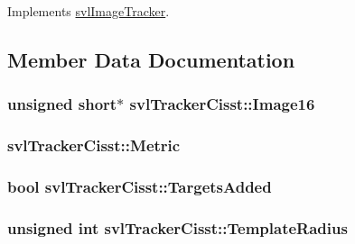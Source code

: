 Implements \hyperlink{classsvl_image_tracker_aa806fe1fe56828124a85cb81e0d7bd7f}{svl\-Image\-Tracker}.



\subsection{Member Data Documentation}
\hypertarget{classsvl_tracker_cisst_a3ad9f3f0177e9f8561d4d625fd12f7f9}{
\subsubsection[{Image16}]{\setlength{\rightskip}{0pt plus 5cm}unsigned short$\ast$ svl\-Tracker\-Cisst\-::\-Image16\hspace{0.3cm}{\ttfamily [protected]}}}\label{classsvl_tracker_cisst_a3ad9f3f0177e9f8561d4d625fd12f7f9}
\hypertarget{classsvl_tracker_cisst_a2b06845718501c085a46b5c751ee1017}{
\subsubsection[{Metric}]{ svl\-Tracker\-Cisst\-::\-Metric\hspace{0.3cm}{\ttfamily [protected]}}}\label{classsvl_tracker_cisst_a2b06845718501c085a46b5c751ee1017}
\hypertarget{classsvl_tracker_cisst_a2fabfddceafae8de9d5fdbdc2a85caf3}{
\subsubsection[{Targets\-Added}]{\setlength{\rightskip}{0pt plus 5cm}bool svl\-Tracker\-Cisst\-::\-Targets\-Added\hspace{0.3cm}{\ttfamily [protected]}}}\label{classsvl_tracker_cisst_a2fabfddceafae8de9d5fdbdc2a85caf3}
\hypertarget{classsvl_tracker_cisst_a342d51eb374760e550a5b621e686e764}{
\subsubsection[{Template\-Radius}]{\setlength{\rightskip}{0pt plus 5cm}unsigned int svl\-Tracker\-Cisst\-::\-Template\-Radius\hspace{0.3cm}{\ttfamily [protected]}}}\label{classsvl_tracker_cisst_a342d51eb374760e550a5b621e686e764}
